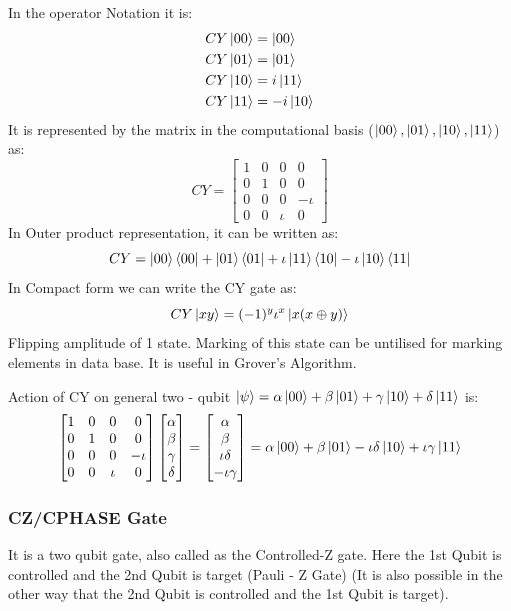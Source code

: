 In the operator Notation it is:
\begin{align*}
    CY\ket{00}&=\ket{00} \\
    CY\ket{01}&=\ket{01} \\
    CY\ket{10}&=i\ket{11} \\
    CY\ket{11}&=-i\ket{10}
\end{align*}
It is represented by the matrix in the computational basis ($\ket{00},\ket{01},\ket{10},\ket{11}$) as:
\[
    CY=\begin{bmatrix}
        1 & 0 & 0 & 0 \\
        0 & 1 & 0 & 0 \\
        0 & 0 & 0 & -\iota \\
        0 & 0 & \iota & 0
    \end{bmatrix}
\]
In Outer product representation, it can be written as:
\[
    CY=\ket{00}\bra{00}+\ket{01}\bra{01}+\iota\ket{11}\bra{10}-\iota\ket{10}\bra{11}
\]
In Compact form we can write the CY gate as:
\[
    CY\ket{xy}=(-1)^y\iota^x\ket{x(x\oplus y)}
\]
Flipping amplitude of 1 state. Marking of this state can be untilised for marking elements in data base.
It is useful in Grover's Algorithm.

Action of CY on general two - qubit $\ket{\psi} = \alpha\ket{00}+\beta\ket{01}+\gamma\ket{10}+\delta\ket{11}$ is:
\[
    \begin{bmatrix} 
        1 & 0 & 0 & 0 \\
        0 & 1 & 0 & 0 \\
        0 & 0 & 0 & -\iota \\
        0 & 0 & \iota & 0
    \end{bmatrix}\begin{bmatrix}
        \alpha \\
        \beta \\
        \gamma \\
        \delta
    \end{bmatrix}=\begin{bmatrix}
        \alpha \\
        \beta \\
        \iota\delta \\
        -\iota\gamma
    \end{bmatrix}=\alpha\ket{00}+\beta\ket{01}-\iota\delta\ket{10}+\iota\gamma\ket{11}
\]

\subsubsection{CZ/CPHASE Gate}
It is a two qubit gate, also called as the Controlled-Z gate.
Here the 1st Qubit is controlled and the 2nd Qubit is target (Pauli - Z Gate)
(It is also possible in the other way that the 2nd Qubit is controlled and the 1st Qubit is target).

